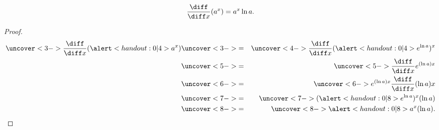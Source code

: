 \begin{frame}
\begin{theorem}
\[
\frac{\diff}{\diff x} (a^x) = a^x \ln a .
\]
\end{theorem}
\begin{proof}
\begin{eqnarray*}
\uncover<3->{\frac{\diff}{\diff x} (\alert<handout:0| 4>{a^x})}%
& \uncover<3->{ = } & %
\uncover<4->{\frac{\diff}{\diff x} (\alert<handout:0| 4>{e^{\ln a}})^x}\\%
& \uncover<5->{ = } & %
\uncover<5->{\frac{\diff}{\diff x} e^{(\ln a)x}}\\%
& \uncover<6->{ = } & %
\uncover<6->{ e^{(\ln a)x}\frac{\diff}{\diff x}(\ln a)x }\\%
& \uncover<7->{ = } & %
\uncover<7->{ (\alert<handout:0| 8>{e^{\ln a}})^x(\ln a) }\\%
& \uncover<8->{ = } & %
\uncover<8->{ \alert<handout:0| 8>{a}^x(\ln a).}%
\end{eqnarray*}
\end{proof}
\end{frame}
